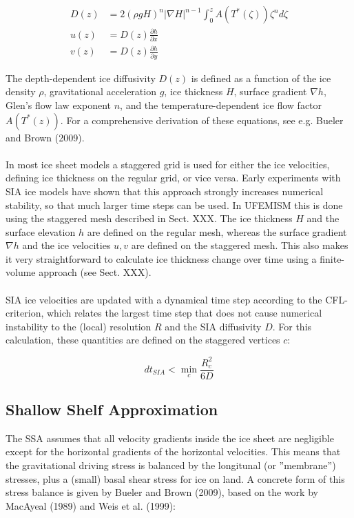 \documentclass{article}
\begin{document}
\begin{align} \label{eq:SIA}
D(z) &= 2 {(\rho g H)}^n {\left| \nabla H \right| }^{n-1} \int_0^z A\left( T^{\ast}(\zeta)\right) \zeta^n d\zeta \\
u(z) &= D(z) \frac{\partial h}{\partial x} \\
v(z) &= D(z) \frac{\partial h}{\partial y}
\end{align}

The depth-dependent ice diffusivity $D(z)$ is defined as a function of the ice density $\rho$, gravitational acceleration $g$, ice thickness $H$, surface gradient $\nabla h$, Glen's flow law exponent $n$, and the temperature-dependent ice flow factor $A\left( T^{\ast}(z) \right)$. For a comprehensive derivation of these equations, see e.g. Bueler and Brown (2009).\\
\\
In most ice sheet models a staggered grid is used for either the ice velocities, defining ice thickness on the regular grid, or vice versa. Early experiments with SIA ice models have shown that this approach strongly increases numerical stability, so that much larger time steps can be used. In UFEMISM this is done using the staggered mesh described in Sect. XXX. The ice thickness $H$ and the surface elevation $h$ are defined on the regular mesh, whereas the surface gradient $\nabla h$ and the ice velocities $u,v$ are defined on the staggered mesh. This also makes it very straightforward to calculate ice thickness change over time using a finite-volume approach (see Sect. XXX).\\
\\
SIA ice velocities are updated with a dynamical time step according to the CFL-criterion, which relates the largest time step that does not cause numerical instability to the (local) resolution $R$ and the SIA diffusivity $D$. For this calculation, these quantities are defined on the staggered vertices $c$:

\begin{equation} \label{eq:SIA_dt}
dt_{SIA} < \min_c \frac{R_c^2}{6D}
\end{equation}

\subsection{Shallow Shelf Approximation}

The SSA assumes that all velocity gradients inside the ice sheet are negligible except for the horizontal gradients of the horizontal velocities. This means that the gravitational driving stress is balanced by the longitunal (or ''membrane'') stresses, plus a (small) basal shear stress for ice on land. A concrete form of this stress balance is given by Bueler and Brown (2009), based on the work by MacAyeal (1989) and Weis et al. (1999):
\end{document}
